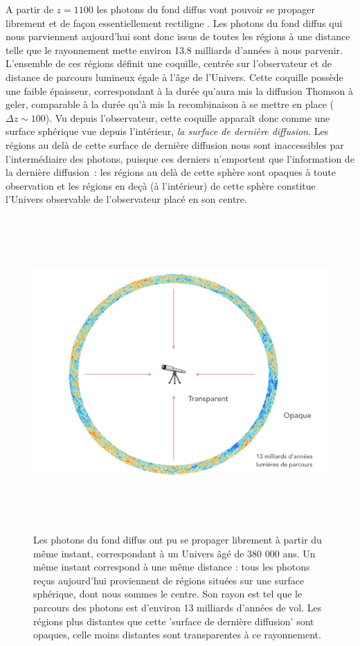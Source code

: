 A partir de $z=1100$ les photons du fond diffus vont pouvoir se propager librement et de façon essentiellement rectiligne . Les photons du fond diffus qui nous parviennent aujourd'hui sont donc issus de toutes les régions à une distance telle que le rayonnement mette environ 13.8 milliards d'années à nous parvenir. L'ensemble de ces régions définit une coquille, centrée sur l'observateur et de distance de parcours lumineux égale à l'âge de l'Univers. Cette coquille possède une faible épaisseur, correspondant à la durée qu'aura mis la diffusion Thomson à geler, comparable à la durée qu'à mis la recombinaison à se mettre en place ($\Delta z\sim 100$). Vu depuis l'observateur, cette coquille apparaît donc comme une surface sphérique vue depuis l'intérieur, \textit{la surface de dernière diffusion}. Les régions au delà de cette surface de dernière diffusion nous sont inaccessibles par l'intermédiaire des photons, puisque ces derniers n'emportent que l'information de la dernière diffusion~: les régions au delà de cette sphère sont opaques à toute observation et les régions en deçà (à l'intérieur) de cette sphère constitue l'Univers observable de l'observateur placé en son centre.

\begin{figure}[htbp]
	\centering
		\includegraphics[height=12cm]{figs/LSS.png}
	\caption[L'Univers devient transparent au CMB]{Les photons du fond diffus ont pu se propager librement à partir du même instant, correspondant à un Univers âgé de 380 000 ans. Un même instant correspond à une même distance : tous les photons reçus aujourd'hui proviennent de régions situées sur une surface sphérique, dont nous sommes le centre. Son rayon est tel que le parcours des photons est d'environ 13 milliards d'années de vol. Les régions plus distantes que cette 'surface de dernière diffusion' sont opaques, celle moins distantes sont transparentes à ce rayonnement.}
	\label{f:LSS}
\end{figure}

